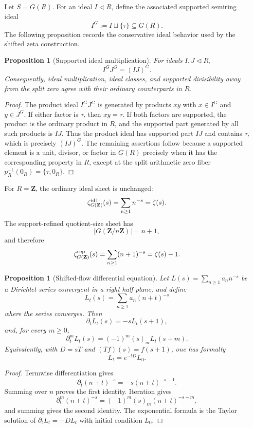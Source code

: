 \documentclass[11pt]{article}
\newcommand{\Z}{\mathbf Z}
\theoremstyle{plain}
\newtheorem{proposition}[theorem]{Proposition}
\theoremstyle{definition}
\begin{document}
Let \(S=G(R)\).  For an ideal \(I\lhd R\), define the associated supported semiring ideal
\[
   I^G:=I\sqcup\{\tau\}\subseteq G(R).
\]
The following proposition records the conservative ideal behavior used by the shifted zeta construction.

\begin{proposition}[Supported ideal multiplication]\label{prop:supported-ideal-mult}
For ideals \(I,J\lhd R\),
\[
   I^GJ^G=(IJ)^G.
\]
Consequently, ideal multiplication, ideal classes, and supported divisibility away from the split zero agree with their ordinary counterparts in \(R\).
\end{proposition}

\begin{proof}
The product ideal \(I^GJ^G\) is generated by products \(xy\) with \(x\in I^G\) and \(y\in J^G\).  If either factor is \(\tau\), then \(xy=\tau\).  If both factors are supported, the product is the ordinary product in \(R\), and the supported part generated by all such products is \(IJ\).  Thus the product ideal has supported part \(IJ\) and contains \(\tau\), which is precisely \((IJ)^G\).  The remaining assertions follow because a supported element is a unit, divisor, or factor in \(G(R)\) precisely when it has the corresponding property in \(R\), except at the split arithmetic zero fiber \(p_R^{-1}(0_R)=\{\tau,0_R\}\).
\end{proof}

For \(R=\Z\), the ordinary ideal sheet is unchanged:
\[
   \zeta^{\rm idl}_{G(\Z)}(s)=\sum_{n\ge1}n^{-s}=\zeta(s).
\]
The support-refined quotient-size sheet has
\[
   |G(\Z/n\Z)|=n+1,
\]
and therefore
\[
   \zeta^{\rm sep}_{G(\Z)}(s)=\sum_{n\ge1}(n+1)^{-s}=\zeta(s)-1.
\]

\begin{proposition}[Shifted-flow differential equation]\label{prop:shifted-flow-equation}
Let \(L(s)=\sum_{n\ge1}a_n n^{-s}\) be a Dirichlet series convergent in a right half-plane, and define
\[
   L_t(s)=\sum_{n\ge1}a_n(n+t)^{-s}
\]
where the series converges.  Then
\[
   \partial_tL_t(s)=-sL_t(s+1),
\]
and, for every \(m\ge0\),
\[
   \partial_t^mL_t(s)=(-1)^m(s)_mL_t(s+m).
\]
Equivalently, with \(D=sT\) and \((Tf)(s)=f(s+1)\), one has formally
\[
   L_t=e^{-tD}L_0.
\]
\end{proposition}

\begin{proof}
Termwise differentiation gives
\[
   \partial_t(n+t)^{-s}=-s(n+t)^{-s-1}.
\]
Summing over \(n\) proves the first identity.  Iteration gives
\[
   \partial_t^m(n+t)^{-s}=(-1)^m(s)_m(n+t)^{-s-m},
\]
and summing gives the second identity.  The exponential formula is the Taylor solution of \(\partial_tL_t=-DL_t\) with initial condition \(L_0\).
\end{proof}
\end{document}
